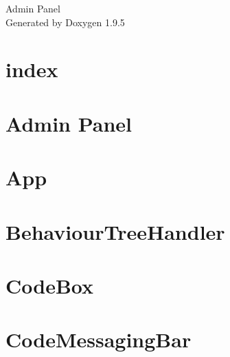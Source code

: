 \documentclass[twoside]{book}
\newcommand{\+}{\discretionary{\mbox{\scriptsize$\hookleftarrow$}}{}{}}
\newcommand{\clearemptydoublepage}{%
    \newpage{\pagestyle{empty}\cleardoublepage}%
  }
\begin{document}
  \raggedbottom
    \hypersetup{pageanchor=false,
                bookmarksnumbered=true,
                pdfencoding=unicode
               }
  \begin{titlepage}
  \vspace*{7cm}
  \begin{center}%
  {\Large Admin Panel}\\
  \vspace*{1cm}
  {\large Generated by Doxygen 1.9.5}\\
  \end{center}
  \end{titlepage}
  \clearemptydoublepage
  \tableofcontents
  \clearemptydoublepage
  \hypersetup{pageanchor=true}
\chapter{index}
\label{md_public_index}

\chapter{Admin Panel}
\label{md_README}

\chapter{App}
\label{md_src_App}

\chapter{Behaviour\+Tree\+Handler}
\label{md_src_lib_BehaviourTreeHandler}

\chapter{Code\+Box}
\label{md_src_lib_home_CodeBox}

\chapter{Code\+Messaging\+Bar}
\label{md_src_lib_home_CodeMessagingBar}

\end{document}
